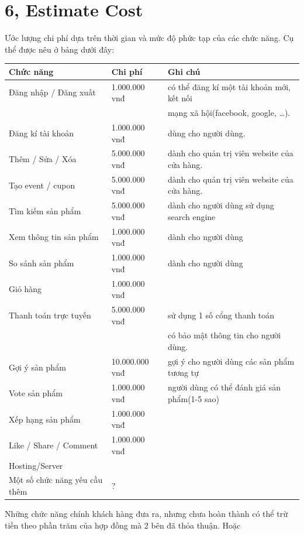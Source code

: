 \documentclass[a4paper,11pt]{report}
\begin{document}
\section*{6, Estimate Cost}
Ước lượng chi phí dựa trên thời gian và mức độ phức tạp của các chức năng. Cụ thể được nêu ở bảng dưới đây:
\begin{longtable}{|l|l|l|}
\hline
Chức năng & Chi phí & Ghi chú \\ 
\hline
Đăng nhập / Đăng xuất & 1.000.000 vnđ & có thể đăng kí một tài khoản mới, kết nối \\
& & mạng xã hội(facebook, google, \ldots). \\
\hline
Đăng kí tài khoản & 1.000.000 vnđ & dùng cho người dùng. \\
\hline
Thêm / Sửa / Xóa & 5.000.000 vnđ & dành cho quản trị viên website của cửa hàng. \\
\hline
Tạo event / cupon & 5.000.000 vnđ & dành cho quản trị viên website của cửa hàng. \\
\hline
Tìm kiếm sản phẩm & 5.000.000 vnđ & dành cho người dùng sử dụng search engine\\
\hline 
Xem thông tin sản phẩm & 1.000.000 vnđ & dành cho người dùng \\
\hline
So sánh sản phẩm & 1.000.000 vnđ & dành cho người dùng \\
\hline
Giỏ hàng & 1.000.000 vnđ & \\
\hline
Thanh toán trực tuyến & 5.000.000 vnđ & sử dụng 1 số cổng thanh toán \\
& & có bảo mật thông tin cho người dùng. \\
\hline
Gợi ý sản phẩm & 10.000.000 vnđ & gợi ý cho người dùng các sản phẩm tương tự \\
\hline
Vote sản phẩm & 1.000.000 vnđ & người dùng có thể đánh giá sản phẩm(1-5 sao) \\
\hline
Xếp hạng sản phẩm & 1.000.000 vnđ & \\
\hline
Like / Share / Comment & 1.000.000 vnđ & \\ 
\hline
Hosting/Server & & \\
\hline
Một số chức năng yêu cầu thêm & ? & \\
\hline   
\end{longtable}
Những chức năng chính khách hàng đưa ra, nhưng chưa hoàn thành có thể trừ tiền theo phần trăm của hợp đồng mà 2 bên đã thỏa thuận. Hoặc 
\end{document}
